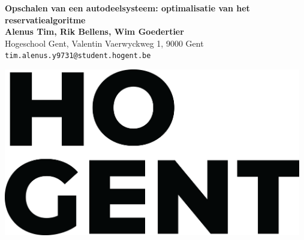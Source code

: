 \documentclass[a0,portrait]{a0poster}
\begin{document}


\begin{minipage}[t]{0.75\linewidth}
\VeryHuge \color{HoGentAccent1} \textbf{Opschalen van een autodeelsysteem: optimalisatie van het reservatiealgoritme} \color{Black}\\ %
\huge \textbf{Alenus Tim, Rik Bellens, Wim Goedertier}\\[0.5cm] %
\huge Hogeschool Gent, Valentin Vaerwyckweg 1, 9000 Gent\\[0.4cm] %
\Large \texttt{tim.alenus.y9731@student.hogent.be} \\
\end{minipage}
%
\begin{minipage}[t]{0.25\linewidth}
\includegraphics[width=13cm,right]{figures/HOGENT_Logo_Pos_rgb.png} 

\end{minipage}

\vspace{1cm} %

\end{document}
